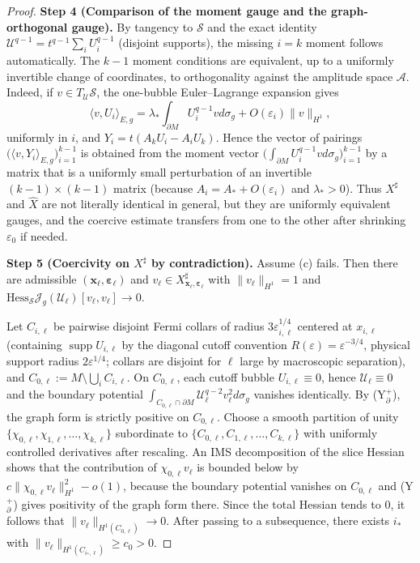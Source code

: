 \documentclass[11pt,reqno,a4paper]{amsart}
\DeclareMathOperator{\supp}{supp}
\numberwithin{equation}{section}
\theoremstyle{plain}
\theoremstyle{remark}
\theoremstyle{plain}
\begin{document}
\begin{proof}
\medskip\noindent
\textbf{Step 4 (Comparison of the moment gauge and the graph-orthogonal gauge).}
By tangency to $\mathcal S$ and the exact identity
$\mathcal U^{q-1}=t^{q-1}\sum_iU_i^{q-1}$ (disjoint supports),
the missing $i=k$ moment follows automatically.
The $k-1$ moment conditions are equivalent, up to a uniformly invertible change of coordinates,
to orthogonality against the amplitude space $\mathcal A$.
Indeed, if $v\in T_{\mathcal U}\mathcal S$, the one-bubble Euler--Lagrange expansion gives
\[
\langle v,U_i\rangle_{E,g}
=\lambda_\ast\int_{\partial M}U_i^{q-1}vd\sigma_g+O(\varepsilon_i)\|v\|_{H^1},
\]
uniformly in $i$, and $Y_i=t(A_kU_i-A_iU_k)$.
Hence the vector of pairings $\big(\langle v,Y_i\rangle_{E,g}\big)_{i=1}^{k-1}$
is obtained from the moment vector
$\big(\int_{\partial M}U_i^{q-1}vd\sigma_g\big)_{i=1}^{k-1}$
by a matrix that is a uniformly small perturbation of an invertible $(k-1)\times(k-1)$ matrix
(because $A_i=A_\ast+O(\varepsilon_i)$ and $\lambda_\ast>0$).
Thus $X^\sharp$ and $\widehat X$ are not literally identical in general, but they are uniformly equivalent gauges,
and the coercive estimate transfers from one to the other after shrinking $\varepsilon_0$ if needed.

\medskip\noindent
\textbf{Step 5 (Coercivity on $X^\sharp$ by contradiction).}
Assume (c) fails. Then there are admissible $(\mathbf x_\ell,\boldsymbol\varepsilon_\ell)$ and
$v_\ell\in X^\sharp_{\mathbf x_\ell,\boldsymbol\varepsilon_\ell}$ with
$\|v_\ell\|_{H^1}=1$ and $\mathrm{Hess}_{\mathcal S}\mathcal J_g(\mathcal U_\ell)[v_\ell,v_\ell]\to0$.

Let $C_{i,\ell}$ be pairwise disjoint Fermi collars of radius $3\varepsilon_{i,\ell}^{1/4}$
centered at $x_{i,\ell}$ (containing $\supp U_{i,\ell}$ by the diagonal cutoff convention
$R(\varepsilon)=\varepsilon^{-3/4}$, physical support radius $2\varepsilon^{1/4}$;
collars are disjoint for $\ell$ large by macroscopic separation),
and $C_{0,\ell}:=M\setminus\bigcup_i C_{i,\ell}$.
On $C_{0,\ell}$, each cutoff bubble $U_{i,\ell}\equiv0$, hence $\mathcal U_\ell\equiv0$
and the boundary potential $\int_{C_{0,\ell}\cap\partial M}\mathcal U_\ell^{q-2}v_\ell^2d\sigma_g$
vanishes identically.
By \textup{(Y$^+_\partial$)}, the graph form is strictly positive on $C_{0,\ell}$.
Choose a smooth partition of unity $\{\chi_{0,\ell},\chi_{1,\ell},\dots,\chi_{k,\ell}\}$
subordinate to $\{C_{0,\ell},C_{1,\ell},\dots,C_{k,\ell}\}$ with uniformly controlled derivatives after rescaling.
An IMS decomposition of the slice Hessian shows that the contribution of $\chi_{0,\ell}v_\ell$
is bounded below by $c\|\chi_{0,\ell}v_\ell\|_{H^1}^2-o(1)$, because the boundary potential vanishes on $C_{0,\ell}$
and \textup{(Y$^+_\partial$)} gives positivity of the graph form there.
Since the total Hessian tends to $0$, it follows that $\|v_\ell\|_{H^1(C_{0,\ell})}\to0$.
After passing to a subsequence, there exists $i_\ast$ with
$\|v_\ell\|_{H^1(C_{i_\ast,\ell})}\ge c_0>0$.


\end{proof}
\end{document}

